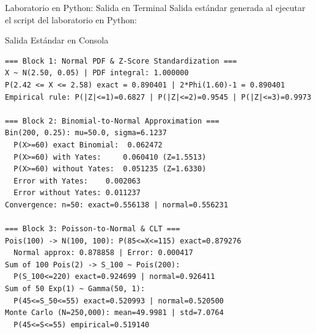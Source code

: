\documentclass[10pt, aspectratio=169]{beamer}
\begin{document}
\begin{frame}[fragile]{Laboratorio en Python: Salida en Terminal}
  \scriptsize
  Salida estándar generada al ejecutar el script del laboratorio en Python:
  \vspace{0.02cm}
  \begin{block}{Salida Estándar en Consola}
    \fontsize{4pt}{5pt}\selectfont
    \begin{verbatim}
=== Block 1: Normal PDF & Z-Score Standardization ===
X ~ N(2.50, 0.05) | PDF integral: 1.000000
P(2.42 <= X <= 2.58) exact = 0.890401 | 2*Phi(1.60)-1 = 0.890401
Empirical rule: P(|Z|<=1)=0.6827 | P(|Z|<=2)=0.9545 | P(|Z|<=3)=0.9973

=== Block 2: Binomial-to-Normal Approximation ===
Bin(200, 0.25): mu=50.0, sigma=6.1237
  P(X>=60) exact Binomial:  0.062472
  P(X>=60) with Yates:     0.060410 (Z=1.5513)
  P(X>=60) without Yates:  0.051235 (Z=1.6330)
  Error with Yates:    0.002063
  Error without Yates: 0.011237
Convergence: n=50: exact=0.556138 | normal=0.556231

=== Block 3: Poisson-to-Normal & CLT ===
Pois(100) -> N(100, 100): P(85<=X<=115) exact=0.879276
  Normal approx: 0.878858 | Error: 0.000417
Sum of 100 Pois(2) -> S_100 ~ Pois(200):
  P(S_100<=220) exact=0.924699 | normal=0.926411
Sum of 50 Exp(1) ~ Gamma(50, 1):
  P(45<=S_50<=55) exact=0.520993 | normal=0.520500
Monte Carlo (N=250,000): mean=49.9981 | std=7.0764
  P(45<=S<=55) empirical=0.519140
    \end{verbatim}
  \end{block}
\end{frame}





\end{document}

